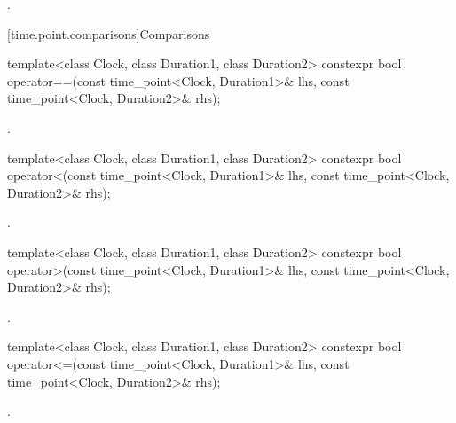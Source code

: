 \begin{itemdescr}
\pnum
\returns
{}.
\end{itemdescr}

[time.point.comparisons]{Comparisons}

%
\begin{itemdecl}
template<class Clock, class Duration1, class Duration2>
  constexpr bool operator==(const time_point<Clock, Duration1>& lhs,
                            const time_point<Clock, Duration2>& rhs);
\end{itemdecl}

\begin{itemdescr}
\pnum
\returns
{}.
\end{itemdescr}

%
\begin{itemdecl}
template<class Clock, class Duration1, class Duration2>
  constexpr bool operator<(const time_point<Clock, Duration1>& lhs,
                           const time_point<Clock, Duration2>& rhs);
\end{itemdecl}

\begin{itemdescr}
\pnum
\returns
{}.
\end{itemdescr}

%
\begin{itemdecl}
template<class Clock, class Duration1, class Duration2>
  constexpr bool operator>(const time_point<Clock, Duration1>& lhs,
                           const time_point<Clock, Duration2>& rhs);
\end{itemdecl}

\begin{itemdescr}
\pnum
\returns
{}.
\end{itemdescr}

%
\begin{itemdecl}
template<class Clock, class Duration1, class Duration2>
  constexpr bool operator<=(const time_point<Clock, Duration1>& lhs,
                            const time_point<Clock, Duration2>& rhs);
\end{itemdecl}

\begin{itemdescr}
\pnum
\returns
{}.
\end{itemdescr}


